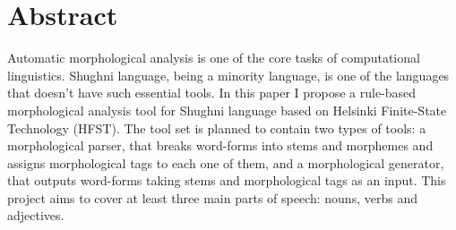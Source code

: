 \section{Abstract}

Automatic morphological analysis is one of the core tasks of computational linguistics. Shughni language, being a minority language, is one of the languages that doesn't have such essential tools. In this paper I propose a rule-based morphological analysis tool for Shughni language based on Helsinki Finite-State Technology (HFST). The tool set is planned to contain two types of tools: a morphological parser, that breaks word-forms into stems and morphemes and assigns morphological tags to each one of them, and a morphological generator, that outputs word-forms taking stems and morphological tags as an input. This project aims to cover at least three main parts of speech: nouns, verbs and adjectives. 